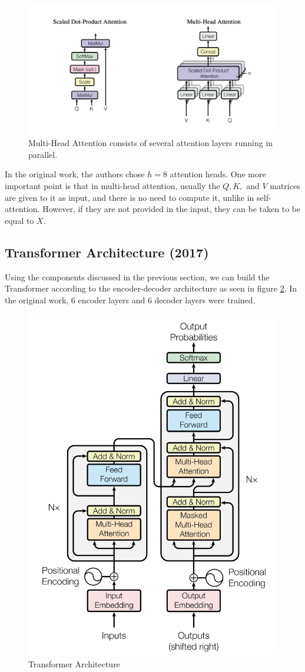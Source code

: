 \begin{figure}[h]
    \centering
    \includegraphics[width=0.9\linewidth]{fig/multi-head.png}
    \caption{Multi-Head Attention consists of several
attention layers running in parallel.}
    \label{fig:enter-label}
\end{figure}

In the original work, the authors chose $h=8$ attention heads. One more important point is that in multi-head attention, usually the $Q, K,$ and $V$ matrices are given to it as input, and there is no need to compute it, unlike in self-attention. However, if they are not provided in the input, they can be taken to be equal to $X$.

\subsection{Transformer Architecture (2017)}

Using the components discussed in the previous section, we can build the Transformer according to the encoder-decoder architecture as seen in figure \ref{fig:transformer}. In the original work, 6 encoder layers and 6 decoder layers were trained.

\begin{figure}[T]
    \centering
    \includegraphics[width=0.65\linewidth]{fig/transfomer.png}
    \caption{Transformer Architecture}
    \label{fig:transformer}
\end{figure}

